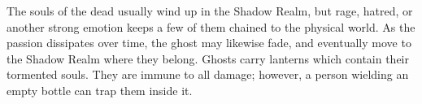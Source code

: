 \documentclass[blue]{Katmeers}
\begin{document}
\name{\bGhosts{}}

The souls of the dead usually wind up in the Shadow Realm, but rage, hatred, or another strong emotion keeps a few of them chained to the physical world.  As the passion dissipates over time, the ghost may likewise fade, and eventually move to the Shadow Realm where they belong.  Ghosts carry lanterns which contain their tormented souls.  They are immune to all damage; however, a person wielding an empty bottle can trap them inside it.
\end{document}

